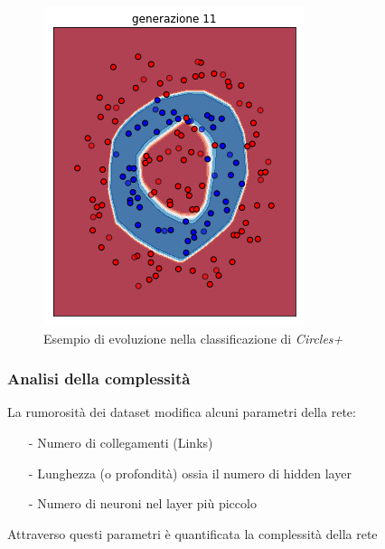 \documentclass{beamer}
\begin{document}
\begin{frame}
\begin{figure}
  \includegraphics[scale = 0.25]{images/circle+-rnd-log./11.png}
  \caption{\large Esempio di evoluzione nella classificazione di \textit{Circles+}}
 \end{figure}   
\end{frame}

\begin{frame}
 \frametitle{Analisi della complessità}
 La rumorosità dei dataset modifica alcuni parametri della rete:
 \begin{enumerate}
  \item [-] Numero di collegamenti (Links)
  \item [-] Lunghezza (o profondità) ossia il numero di hidden layer 
  \item [-] Numero di neuroni nel layer più piccolo
 \end{enumerate}
 Attraverso questi parametri è quantificata la complessità della rete  
\end{frame}
\end{document}
